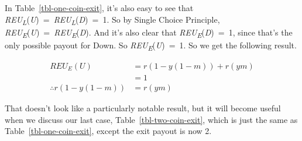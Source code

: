 \documentclass[
  12pt,
  letterpaper,
  DIV=11,
  numbers=noendperiod]{scrreprt}
\begin{document}
In Table~\ref{tbl-one-coin-exit}, it's also easy to see that
\emph{REU\textsubscript{L}}(\emph{U})~=~\emph{REU\textsubscript{L}}(\emph{D})~=~1.
So by Single Choice Principle,
\emph{REU\textsubscript{E}}(\emph{U})~=~\emph{REU\textsubscript{E}}(\emph{D}).
And it's also clear that \emph{REU\textsubscript{E}}(\emph{D})~=~1,
since that's the only possible payout for Down. So
\emph{REU\textsubscript{E}}(\emph{U})~=~1. So we get the following
result.

\begin{align*}
REU_E(U) &= r(1-y(1-m)) + r(ym) \\
 &= 1    \\
\therefore  r(1-y(1-m)) &= r(ym)
\end{align*}

That doesn't look like a particularly notable result, but it will become
useful when we discuss our last case, Table~\ref{tbl-two-coin-exit},
which is just the same as Table~\ref{tbl-one-coin-exit}, except the exit
payout is now 2.

\begin{table}

\caption{\label{tbl-two-coin-exit}An exit game with exit payout 2.}

\begin{minipage}[t]{0.50\linewidth}



\end{minipage}%
%
\begin{minipage}[t]{0.50\linewidth}



\end{minipage}%

\end{table}%
\end{document}
